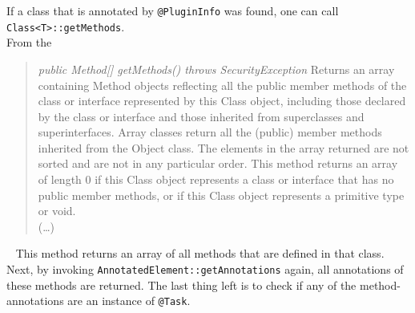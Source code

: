 If a class that is annotated by \lstinline{@PluginInfo} was found, one can call \lstinline{Class<T>::getMethods}.\\
From the \textcite{javadoc:class}
\begin{quote}
    \textit{public Method[] getMethods() throws SecurityException}
    Returns an array containing Method objects reflecting all the public member methods of the class or interface represented by this Class object, including those declared by the class or interface and those inherited from superclasses and superinterfaces. Array classes return all the (public) member methods inherited from the Object class. The elements in the array returned are not sorted and are not in any particular order. This method returns an array of length 0 if this Class object represents a class or interface that has no public member methods, or if this Class object represents a primitive type or void.\\
    (\dots)
\end{quote}~\parencite{javadoc:class}
This method returns an array of all methods that are defined in that class.
Next, by invoking \lstinline{AnnotatedElement::getAnnotations} again, all annotations of these methods are returned.
The last thing left is to check if any of the method-annotations are an instance of \lstinline{@Task}.


